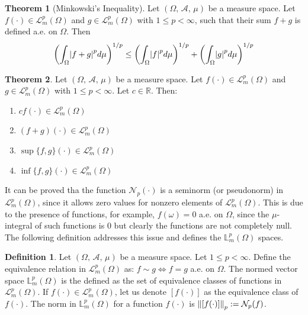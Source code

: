 \documentclass[11pt,letterpaper]{article}
\newcommand{\LL}{{\mathbb{L}}}
\newcommand{\RR}{{\mathbb{R}}}
\newcommand{\A}{{\mathcal{A}}}
\newcommand{\el}{{\mathcal{L}}}
\let\originalleft\left
\let\originalright\right
\renewcommand{\left}{\mathopen{}\mathclose\bgroup\originalleft}
\renewcommand{\right}{\aftergroup\egroup\originalright}
\newcommand{\norm}[1]{\left\lVert#1\right\rVert}
\theoremstyle{definition}
\newtheorem{definition}{Definition}[section]
\newtheorem{theorem}{Theorem}[section]
\begin{document}
\begin{theorem}[Minkowski's Inequality]
Let $(\Omega,\, \mathcal{A},\, \mu)$ be a measure space. Let $f(\cdot)\in\el^p_m(\Omega)$ and $g\in\el^p_m(\Omega)$ with $1\leq p < \infty$, such that their sum $f+g$ is defined a.e. on $\Omega$. Then
\begin{equation}
    \left(\int_\Omega\left|f+g\right|^pd\mu\right)^{1/p} \leq \left(\int_\Omega\left|f\right|^pd\mu\right)^{1/p} + \left(\int_\Omega\left|g\right|^pd\mu\right)^{1/p}
\end{equation}
\end{theorem}
\begin{theorem}
Let $(\Omega,\, \mathcal{A},\, \mu)$ be a measure space. Let $f(\cdot)\in\el^p_m(\Omega)$ and $g\in\el^p_m(\Omega)$ with $1\leq p < \infty$. Let $c\in\RR$. Then:
\begin{multicols}{2}
\begin{enumerate}
    \item $cf(\cdot)\in \el^p_m(\Omega)$
    \item $(f+g)(\cdot)\in \el^p_m(\Omega)$
    \columnbreak
    \item $\sup\{f,g\}(\cdot)\in \el^p_m(\Omega)$
    \item $\inf\{f,g\}(\cdot)\in \el^p_m(\Omega)$
\end{enumerate}
\end{multicols}
\end{theorem}

It can be proved tha the function $\mathcal{N}_p(\cdot)$ is a seminorm (or pseudonorm) in $\el^p_m(\Omega)$, since it allows zero values for nonzero elements of $\el^p_m(\Omega)$. This is due to the presence of functions, for example, $f(\omega)=0$ a.e. on $\Omega$, since the $\mu$-integral of such functions is 0 but clearly the functions are not completely null. The following definition addresses this issue and defines the $\LL_m^p(\Omega)$ spaces.


\begin{definition}
Let $(\Omega,\,\A,\,\mu)$ be a measure space. Let $1\leq p<\infty$. Define the equivalence relation in $\el^p_m(\Omega)$ as: $f\sim g \iff f=g$ a.e. on $\Omega$. The normed vector space $\LL_m^p(\Omega)$ is the defined as the set of equivalence classes of functions in $\el^p_m(\Omega)$. If $f(\cdot)\in\el^p_m(\Omega)$, let us denote $[f(\cdot)]$ as the equivalence class of $f(\cdot)$. The norm in $\LL_m^p(\Omega)$ for a function $f(\cdot)$ is $\norm{[f(\cdot)]}_p:=\mathcal{N}_p(f)$.
\end{definition}
\end{document}
